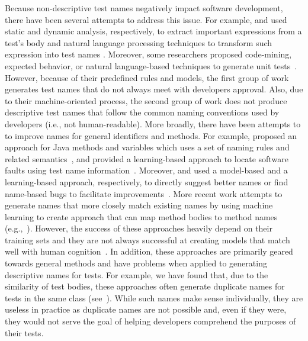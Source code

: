 Because non-descriptive test names negatively impact software development, there have been several attempts to address this issue. %
For example, \citeauthor{zhang2016towards} and \citeauthor{daka2017generating} used static and dynamic analysis, respectively, to extract important expressions from a test's body and natural language processing techniques to transform such expression into test names \cite{zhang2016towards, daka2017generating}.
Moreover, some researchers proposed code-mining, expected behavior, or natural language-based techniques to generate unit tests~\cite{thummalapenta2009mseqgen,fraser2011evosuite,zhang2015automatically}.
However, because of their predefined rules and models, the first group of work generates test names that do not always meet with developers approval.
%
Also, due to their machine-oriented process, the second group of work does not produce descriptive test names that follow the common naming conventions used by developers (i.e., not human-readable).
More broadly, there have been attempts to to improve names for general identifiers and methods.
%
For example, \citeauthor{host2009debugging} proposed an approach for Java methods and variables which uses a set of naming rules and related semantics~\cite{host2009debugging}, and \citeauthor{li2019deepfl} provided a learning-based approach to locate software faults using test name information~\cite{li2019deepfl}.
%
Moreover, \citeauthor{allamanis2015suggesting} and \citeauthor{pradel2018deepbugs} used a model-based and a learning-based approach, respectively, to directly suggest better names or find name-based bugs to facilitate improvements~\cite{allamanis2015suggesting, pradel2018deepbugs}.
%
More recent work attempts to generate names that more closely match existing names by using machine learning to create approach that can map method bodies to method names (e.g.,~\cite{alon2018code2seq, alon2019code2vec}).
%
However, the success of these approaches heavily depend on their training sets and they are not always successful at creating models that match well with human cognition~\cite{lison2015introduction}.
%
In addition, these approaches are primarily geared towards general methods and have problems when applied to generating descriptive names for tests.
%
For example, we have found that, due to the similarity of test bodies, these approaches often generate duplicate names for tests in the same class (see~\cite{CodeResult}).
%
While such names make sense individually, they are useless in practice as duplicate names are not possible and, even if they were, they would not serve the goal of helping developers comprehend the purposes of their tests.



